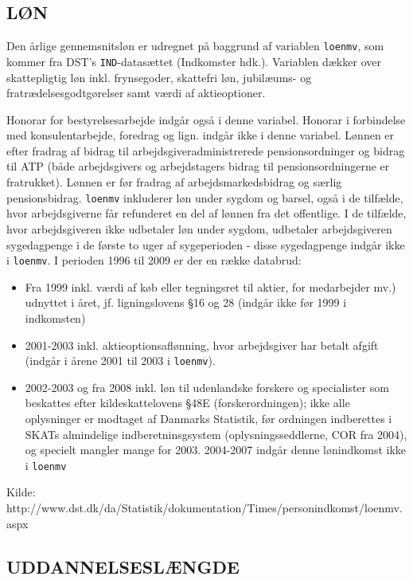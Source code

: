 \subsection{LØN \label{}}

Den årlige gennemsnitsløn er udregnet på baggrund af variablen \texttt{loenmv}, som kommer fra DST's \texttt{IND}-datasættet (Indkomster hdk.). Variablen dækker over skattepligtig løn inkl. frynsegoder, skattefri løn, jubilæums- og fratrædelsesgodtgørelser samt værdi af aktieoptioner. 

Honorar for bestyrelsesarbejde indgår også i denne variabel. Honorar i forbindelse med konsulentarbejde, foredrag og lign. indgår ikke i denne variabel. Lønnen er efter fradrag af bidrag til arbejdsgiveradministrerede pensionsordninger og bidrag til ATP (både arbejdsgivers og arbejdstagers bidrag til pensionsordningerne er fratrukket). Lønnen er før fradrag af arbejdsmarkedsbidrag og særlig pensionsbidrag. \texttt{loenmv} inkluderer løn under sygdom og barsel, også i de tilfælde, hvor arbejdsgiverne får refunderet en del af lønnen fra det offentlige. I de tilfælde, hvor arbejdsgiveren ikke udbetaler løn under sygdom, udbetaler arbejdsgiveren sygedagpenge i de første to uger af sygeperioden - disse sygedagpenge indgår ikke i \texttt{loenmv}.
% 
I perioden 1996 til 2009 er der en række databrud:
% 
\begin{itemize}
  \item Fra 1999 inkl. værdi af køb eller tegningsret til aktier, for medarbejder mv.) udnyttet i året, jf. ligningslovens §16 og 28 (indgår ikke før 1999 i indkomsten)
  \item 2001-2003 inkl. aktieoptionsaflønning, hvor arbejdsgiver har betalt afgift (indgår i årene 2001 til 2003 i \texttt{loenmv}).
  \item 2002-2003 og fra 2008 inkl. løn til udenlandske forskere og specialister som beskattes efter kildeskattelovens §48E (forskerordningen); ikke alle oplysninger er modtaget af Danmarks Statistik, før ordningen indberettes i SKATs almindelige indberetninsgsystem (oplysningsseddlerne, COR fra 2004), og specielt mangler mange for 2003. 2004-2007 indgår denne lønindkomst ikke i \texttt{loenmv}
\end{itemize}
%
Kilde: http://www.dst.dk/da/Statistik/dokumentation/Times/personindkomst/loenmv.aspx


\subsection{UDDANNELSESLÆNGDE \label{}}


